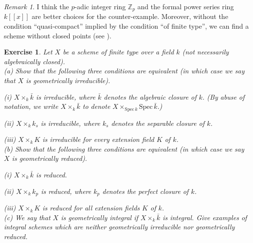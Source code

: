 \documentclass{amsart}
\newtheorem{exe}{Exercise}[subsection]
\theoremstyle{remark}\newtheorem{rmk}[theorem]{Remark}
\begin{document}
\begin{rmk}
	I think the $p$-adic integer ring $\mathbb{Z}_p$ and the formal power series ring $k[[x]]$ are better choices for the counter-example. Moreover, without the condition ``quasi-compact'' implied by the condition ``of finite type'', we can find a scheme without closed points (see \cite[Ch. 3, Ex. 3.27, P. 114]{LIU}).
\end{rmk}
\begin{exe}
	Let $X$ be a scheme of finite type over a field $k$ (not necessarily algebraically closed).\\
	(a) Show that the following three conditions are equivalent (in which case we say that $X$ is \emph{geometrically irreducible}).
	
	(i) $X \times_{k} \bar{k}$ is irreducible, where $\bar{k}$ denotes the algebraic closure of $k$. (By abuse of notation, we write $X\times_k\bar{k}$ to denote $X\times_{\mathrm{Spec}\,k}\mathrm{Spec}\,\bar{k}$.)
	
	(ii) $X \times_{k} k_{s}$ is irreducible, where $k_{s}$ denotes the separable closure of $k$.
	
	(iii) $X \times_{k} K$ is  irreducible for every extension field $K$ of $k$.\\
	(b) Show that the following three conditions are equivalent (in which case we say $X$ is \emph{geometrically reduced}).
	
	(i) $X \times_{k} \bar{k}$ is reduced.
	
	(ii) $X \times_{k} k_{p}$ is reduced, where $k_{p}$ denotes the perfect closure of $k$.
	
	(iii) $X \times_{k} K$ is reduced for all extension fields $K$ of $k$.\\
	(c) We say that $X$ is \emph{geometrically integral} if $X \times_{k} \bar{k}$ is integral. Give examples of integral schemes which are neither geometrically irreducible nor geometrically reduced.
\end{exe}
\end{document}

